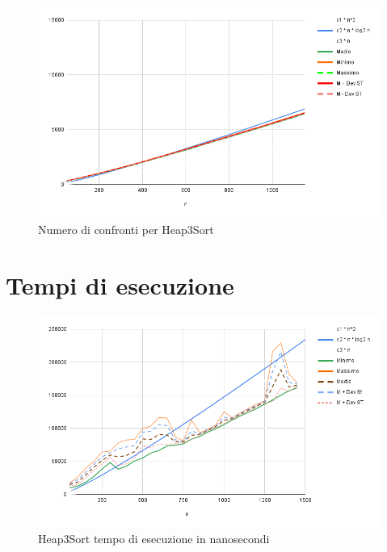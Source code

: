 \documentclass{article}
\begin{document}
\begin{figure}[H]
    \centering
    \includegraphics[width=0.98\linewidth]{Grafici/Heap3SortConf.png}
    \caption{Numero di confronti per Heap3Sort}
    \label{fig:heap_confronti}
\end{figure}

\newpage

\section*{Tempi di esecuzione}
\begin{figure}[H]
    \centering
    \includegraphics[width=0.95\linewidth]{Grafici/Heap3SortTempNs.png}
    \caption{Heap3Sort tempo di esecuzione in nanosecondi}
    \label{fig:heap_tempo}
\end{figure}
\end{document}
